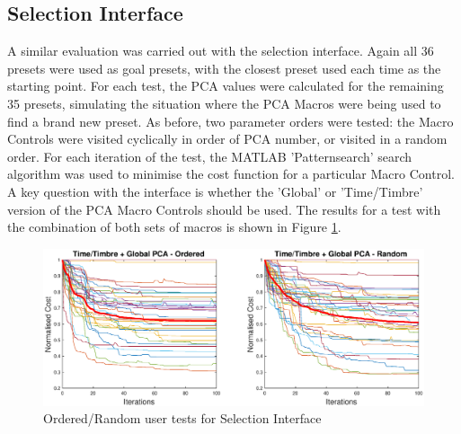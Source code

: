 \documentclass[11pt, oneside]{report}   	%
\begin{document}
\subsection{Selection Interface}
A similar evaluation was carried out with the selection interface. Again all 36 presets were used as goal presets, with the closest preset used each time as the starting point. For each test, the PCA values were calculated for the remaining 35 presets, simulating the situation where the PCA Macros were being used to find a brand new preset. As before, two parameter orders were tested: the Macro Controls were visited cyclically in order of PCA number, or visited in a random order. For each iteration of the test, the MATLAB 'Patternsearch' search algorithm was used to minimise the cost function for a particular Macro Control. \\ 
A key question with the interface is whether the 'Global' or 'Time/Timbre' version of the PCA Macro Controls should be used. The results for a test with the combination of both sets of macros is shown in Figure \ref{fig:PCAtest1}.
\begin{figure}

\hspace{-60pt}
	\includegraphics[width = 8in]{PCAInterfaceTests1.eps}
	\caption{Ordered/Random user tests for Selection Interface}
	\label{fig:PCAtest1}
\end{figure}
\end{document}
